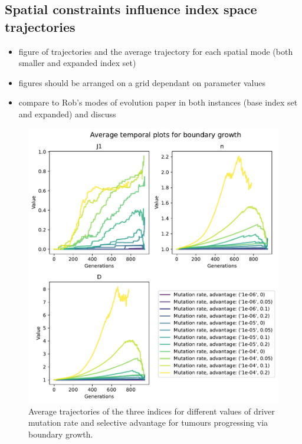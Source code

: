 \subsection{Spatial constraints influence index space trajectories}
\begin{itemize}
    \item figure of trajectories and the average trajectory for each spatial mode (both smaller and expanded index set)
    \item figures should be arranged on a grid dependant on parameter values
    \item compare to Rob's modes of evolution paper in both instances (base index set and expanded) and discuss
\end{itemize}
\begin{figure}
    \centering
    \includegraphics[width=\textwidth]{Chapter_trajectories/figures/boundary-temporal.pdf}
    \caption{Average trajectories of the three indices for different values of driver mutation rate and selective advantage for tumours progressing via boundary growth.}
    \label{fig:boundary-temporal}
\end{figure}
